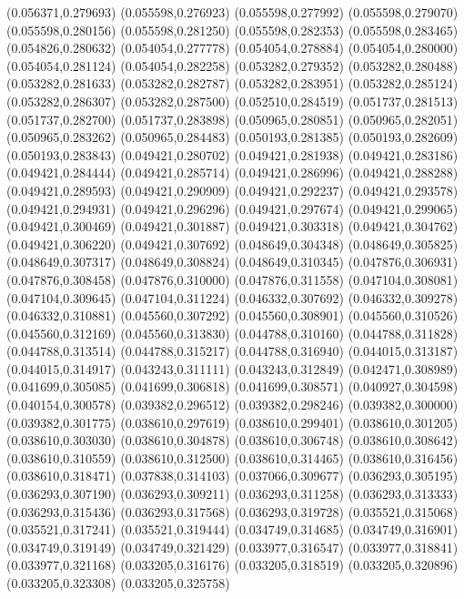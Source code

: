 (0.056371,0.279693)
(0.055598,0.276923)
(0.055598,0.277992)
(0.055598,0.279070)
(0.055598,0.280156)
(0.055598,0.281250)
(0.055598,0.282353)
(0.055598,0.283465)
(0.054826,0.280632)
(0.054054,0.277778)
(0.054054,0.278884)
(0.054054,0.280000)
(0.054054,0.281124)
(0.054054,0.282258)
(0.053282,0.279352)
(0.053282,0.280488)
(0.053282,0.281633)
(0.053282,0.282787)
(0.053282,0.283951)
(0.053282,0.285124)
(0.053282,0.286307)
(0.053282,0.287500)
(0.052510,0.284519)
(0.051737,0.281513)
(0.051737,0.282700)
(0.051737,0.283898)
(0.050965,0.280851)
(0.050965,0.282051)
(0.050965,0.283262)
(0.050965,0.284483)
(0.050193,0.281385)
(0.050193,0.282609)
(0.050193,0.283843)
(0.049421,0.280702)
(0.049421,0.281938)
(0.049421,0.283186)
(0.049421,0.284444)
(0.049421,0.285714)
(0.049421,0.286996)
(0.049421,0.288288)
(0.049421,0.289593)
(0.049421,0.290909)
(0.049421,0.292237)
(0.049421,0.293578)
(0.049421,0.294931)
(0.049421,0.296296)
(0.049421,0.297674)
(0.049421,0.299065)
(0.049421,0.300469)
(0.049421,0.301887)
(0.049421,0.303318)
(0.049421,0.304762)
(0.049421,0.306220)
(0.049421,0.307692)
(0.048649,0.304348)
(0.048649,0.305825)
(0.048649,0.307317)
(0.048649,0.308824)
(0.048649,0.310345)
(0.047876,0.306931)
(0.047876,0.308458)
(0.047876,0.310000)
(0.047876,0.311558)
(0.047104,0.308081)
(0.047104,0.309645)
(0.047104,0.311224)
(0.046332,0.307692)
(0.046332,0.309278)
(0.046332,0.310881)
(0.045560,0.307292)
(0.045560,0.308901)
(0.045560,0.310526)
(0.045560,0.312169)
(0.045560,0.313830)
(0.044788,0.310160)
(0.044788,0.311828)
(0.044788,0.313514)
(0.044788,0.315217)
(0.044788,0.316940)
(0.044015,0.313187)
(0.044015,0.314917)
(0.043243,0.311111)
(0.043243,0.312849)
(0.042471,0.308989)
(0.041699,0.305085)
(0.041699,0.306818)
(0.041699,0.308571)
(0.040927,0.304598)
(0.040154,0.300578)
(0.039382,0.296512)
(0.039382,0.298246)
(0.039382,0.300000)
(0.039382,0.301775)
(0.038610,0.297619)
(0.038610,0.299401)
(0.038610,0.301205)
(0.038610,0.303030)
(0.038610,0.304878)
(0.038610,0.306748)
(0.038610,0.308642)
(0.038610,0.310559)
(0.038610,0.312500)
(0.038610,0.314465)
(0.038610,0.316456)
(0.038610,0.318471)
(0.037838,0.314103)
(0.037066,0.309677)
(0.036293,0.305195)
(0.036293,0.307190)
(0.036293,0.309211)
(0.036293,0.311258)
(0.036293,0.313333)
(0.036293,0.315436)
(0.036293,0.317568)
(0.036293,0.319728)
(0.035521,0.315068)
(0.035521,0.317241)
(0.035521,0.319444)
(0.034749,0.314685)
(0.034749,0.316901)
(0.034749,0.319149)
(0.034749,0.321429)
(0.033977,0.316547)
(0.033977,0.318841)
(0.033977,0.321168)
(0.033205,0.316176)
(0.033205,0.318519)
(0.033205,0.320896)
(0.033205,0.323308)
(0.033205,0.325758)
